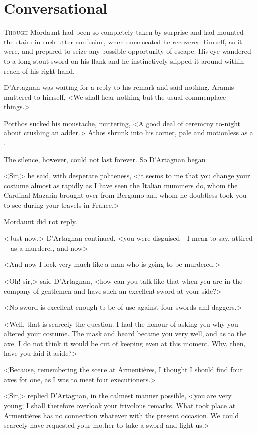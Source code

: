 \chapter{Conversational}

 \lettrine{T}{hough} Mordaunt had been so completely taken by surprise and had mounted the stairs in such utter confusion, when once seated he recovered himself, as it were, and prepared to seize any possible opportunity of escape. His eye wandered to a long stout sword on his flank and he instinctively slipped it around within reach of his right hand.

D'Artagnan was waiting for a reply to his remark and said nothing. Aramis muttered to himself, <We shall hear nothing but the usual commonplace things.>

Porthos sucked his moustache, muttering, <A good deal of ceremony to-night about crushing an adder.> Athos shrunk into his corner, pale and motionless as a .

The silence, however, could not last forever. So D'Artagnan began:

<Sir,> he said, with desperate politeness, <it seems to me that you change your costume almost as rapidly as I have seen the Italian mummers do, whom the Cardinal Mazarin brought over from Bergamo and whom he doubtless took you to see during your travels in France.>

Mordaunt did not reply.

<Just now,> D'Artagnan continued, <you were disguised—I mean to say, attired—as a murderer, and now\longdash>

<And now I look very much like a man who is going to be murdered.>

<Oh! sir,> said D'Artagnan, <how can you talk like that when you are in the company of gentlemen and have such an excellent sword at your side?>

<No sword is excellent enough to be of use against four swords and daggers.>

<Well, that is scarcely the question. I had the honour of asking you why you altered your costume. The mask and beard became you very well, and as to the axe, I do not think it would be out of keeping even at this moment. Why, then, have you laid it aside?>

<Because, remembering the scene at Armentières, I thought I should find four axes for one, as I was to meet four executioners.>

<Sir,> replied D'Artagnan, in the calmest manner possible, <you are very young; I shall therefore overlook your frivolous remarks. What took place at Armentières has no connection whatever with the present occasion. We could scarcely have requested your mother to take a sword and fight us.>

